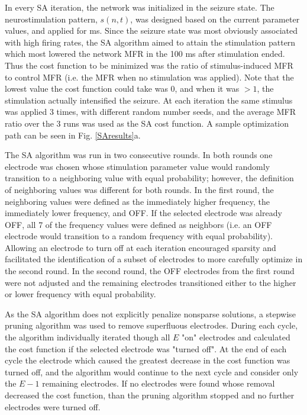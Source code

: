 \documentclass[11pt,a4paper,final]{article}
\begin{document}
In every SA iteration, the network was initialized in the seizure state.
The neurostimulation pattern, $s(n,t)$, was designed based on the current parameter values, and applied for \len ms.
Since the seizure state was most obviously associated with high firing rates, the SA algorithm aimed to attain the stimulation pattern which most lowered the network MFR in the 100 ms after stimulation ended.
Thus the cost function to be minimized was the ratio of stimulus-induced MFR to control MFR (i.e. the MFR when no stimulation was applied).
Note that the lowest value the cost function could take was 0, and when it was $>1$, the stimulation actually intensified the seizure.
At each iteration the same stimulus was applied 3 times, with different random number seeds, and the average MFR ratio over the 3 runs was used as the SA cost function.
A sample optimization path can be seen in Fig. \ref{SAresults}a.

The SA algorithm was run in two consecutive rounds.
In both rounds one electrode was chosen whose stimulation parameter value would randomly transition to a neighboring value with equal probability; however, the definition of neighboring values was different for both rounds. 
In the first round, the neighboring values were defined as the immediately higher frequency, the immediately lower frequency, and OFF.
If the selected electrode was already OFF, all 7 of the frequency values were defined as neighbors (i.e. an OFF electrode would transition to a random frequency with equal probability).
Allowing an electrode to turn off at each iteration encouraged sparsity and facilitated the identification of a subset of electrodes to more carefully optimize in the second round.
In the second round, the OFF electrodes from the first round were not adjusted and the remaining electrodes transitioned either to the higher or lower frequency with equal probability.

As the SA algorithm does not explicitly penalize nonsparse solutions, a stepwise pruning algorithm was used to remove superfluous electrodes.
During each cycle, the algorithm individually iterated though all $E$ "on" electrodes and calculated the cost function if the selected electrode was "turned off".
At the end of each cycle the electrode which caused the greatest decrease in the cost function was turned off, and the algorithm would continue to the next cycle and consider only the $E-1$ remaining electrodes.
If no electrodes were found whose removal decreased the cost function, than the pruning algorithm stopped and no further electrodes were turned off.
\end{document}
